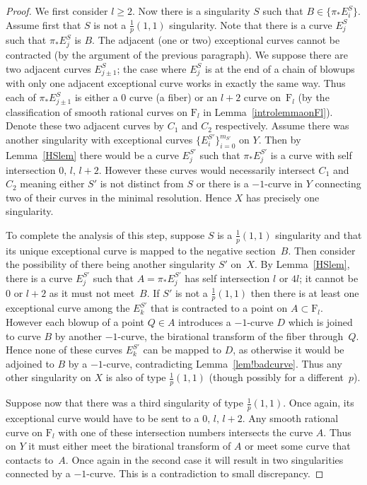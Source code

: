 \documentclass[11pt]{amsbook}
\theoremstyle{plain}
\newcommand{\F}{\mathrm{F}}
\begin{document}
\begin{proof}
We first consider $l\geq 2$. Now there is a singularity $S$ such that $B \in \{ \pi_*E_i^S \}$. Assume first that $S$ is not a $\frac{1}{p}(1,1)$ singularity. Note that there is a curve $E_j^S$ such that $\pi_* E_j^S$ is $B$. The adjacent (one or two) exceptional curves cannot be contracted (by the argument of the previous paragraph). We suppose there are two adjacent curves $E_{j\pm 1}^S$; the case where $E_j^S$ is at the end of a chain of blowups with only one adjacent exceptional curve works in exactly the same way. Thus each of $\pi_*E_{j\pm 1}^S$ is either a $0$ curve (a fiber) or an $l+2$ curve on~$\F_l$ (by the classification of smooth rational curves on $\F_l$ in Lemma~\ref{introlemmaonFl}).
Denote these two adjacent curves by $C_1$ and $C_2$ respectively. Assume there was another singularity with exceptional curves $\{ E_i^{S'} \}_{i=0}^{m_{S'}} $ on $Y$. Then by Lemma~\ref{HSlem} there would be a curve $E_j^{S'}$ such that $\pi_* E_j^{S'}$ is a curve with self intersection $0, \,  l,\,  l+2$. However these curves would necessarily intersect $C_1$ and $C_2$ meaning either $S'$ is not distinct from $S$ or there is a $-1$-curve in $Y$ connecting two of their curves in the minimal resolution. Hence $X$ has precisely one singularity. 

To complete the analysis of this step, suppose $S$ is a $\frac{1}{p}(1,1)$ singularity and that its unique exceptional curve is mapped to the negative section~$B$. Then consider the possibility of there being another singularity $S'$ on~$X$. By Lemma~\ref{HSlem}, there is a curve $E_j^{S'}$ such that $A=\pi_* E_j^{S'}$ has self intersection $l$ or $4l$; it cannot be $0$ or $l+2$ as it must not meet~$B$. If $S'$ is not a $\frac{1}{p}(1,1)$ then there is at least one exceptional curve among the $E_k^{S'}$ that is contracted to a point on $A\subset\F_l$. However each blowup of a point $Q\in A$ introduces a $-1$-curve $D$ which is joined to curve $B$ by another $-1$-curve, the birational transform of the fiber through~$Q$. Hence none of these curves $E_k^{S'}$ can be mapped to $D$, as otherwise it would be adjoined to $B$ by a $-1$-curve, contradicting Lemma~\ref{lem!badcurve}.
Thus any other singularity on $X$ is also of type $\frac{1}{p}(1,1)$ (though possibly for a different~$p$).

Suppose now that there was a third singularity of type $\frac{1}{p}(1,1)$. Once again, its exceptional curve would have to be sent to a $0, \, l, \, l+2$. Any smooth rational curve on $\F_l$ with one of these intersection numbers intersects the curve $A$. Thus on $Y$ it must either meet the birational transform of $A$ or meet some curve that contacts to~$A$. Once again in the second case it will result in two singularities connected by a $-1$-curve. This is a contradiction to small discrepancy.


\end{proof}
\end{document}
